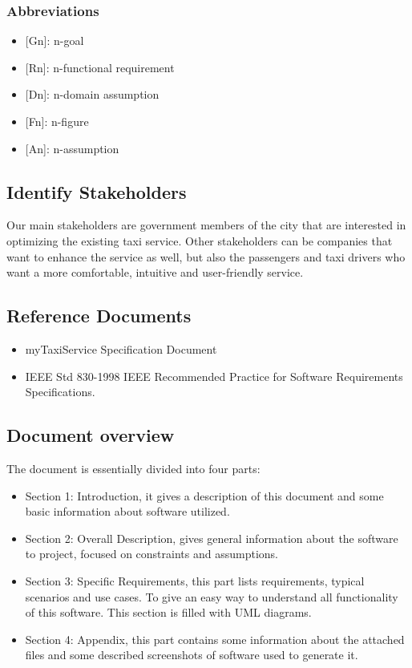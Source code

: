 \documentclass[a4paper,12pt]{article}%
\newcounter{assumptions_counter}
\newcounter{func_req_counter}
\begin{document}
\subsubsection{Abbreviations}
\begin{itemize}
\item {[}Gn{]}: n-goal %
\item {[}Rn{]}: n-functional requirement
\item {[}Dn{]}: n-domain assumption
\item {[}Fn{]}: n-figure
\item {[}An{]}: n-assumption
\end{itemize}
\subsection{Identify Stakeholders}
Our main stakeholders are government members of the city that are interested in optimizing the existing taxi service.
Other stakeholders can be companies that want to enhance the service as well, but also the passengers and taxi drivers who want a more comfortable, intuitive and user-friendly service.
\subsection{Reference Documents}
\begin{itemize}
\item myTaxiService Specification Document
\item IEEE Std 830-1998 IEEE Recommended Practice for Software 
Requirements Specifications.
\end{itemize}
\subsection{Document overview}
The document is essentially divided into four parts:
\begin{itemize}
\item Section 1: Introduction, it gives a description of this document and some basic information about software utilized.
\item Section 2: Overall Description, gives general information about the software to project, focused on constraints and assumptions.
\item Section 3: Specific Requirements, this part lists requirements, typical scenarios and use cases. To give an easy way to understand all functionality
of this software. This section is filled with UML diagrams.
\item  Section 4: Appendix, this part contains some information about the attached files and some described screenshots of software used to generate
it.
\end{itemize}
\newpage
\end{document}
